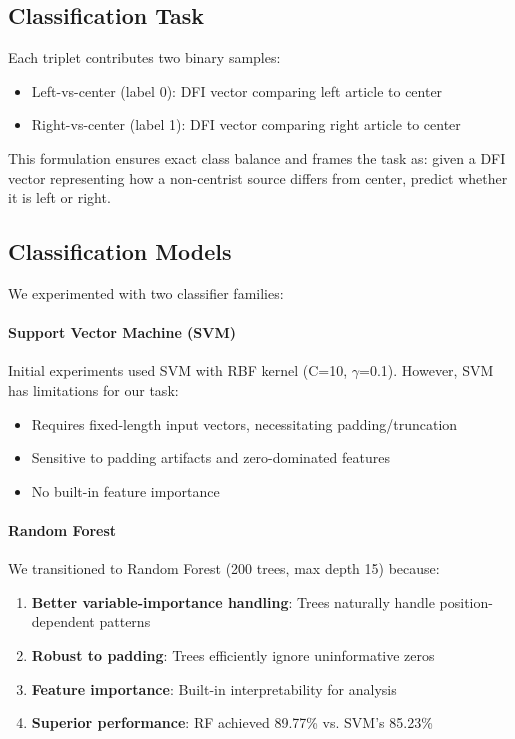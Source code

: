 \documentclass[11pt]{article}
\begin{document}
\subsection{Classification Task}

Each triplet contributes two binary samples:
\begin{itemize}
    \item Left-vs-center (label 0): DFI vector comparing left article to center
    \item Right-vs-center (label 1): DFI vector comparing right article to center
\end{itemize}

This formulation ensures exact class balance and frames the task as: given a DFI vector representing how a non-centrist source differs from center, predict whether it is left or right.

\subsection{Classification Models}

We experimented with two classifier families:

\paragraph{Support Vector Machine (SVM)}
Initial experiments used SVM with RBF kernel (C=10, $\gamma$=0.1). However, SVM has limitations for our task:
\begin{itemize}
    \item Requires fixed-length input vectors, necessitating padding/truncation
    \item Sensitive to padding artifacts and zero-dominated features
    \item No built-in feature importance
\end{itemize}

\paragraph{Random Forest}
We transitioned to Random Forest (200 trees, max depth 15) because:
\begin{enumerate}
    \item \textbf{Better variable-importance handling}: Trees naturally handle position-dependent patterns
    \item \textbf{Robust to padding}: Trees efficiently ignore uninformative zeros
    \item \textbf{Feature importance}: Built-in interpretability for analysis
    \item \textbf{Superior performance}: RF achieved 89.77\% vs. SVM's 85.23\%
\end{enumerate}
\end{document}
